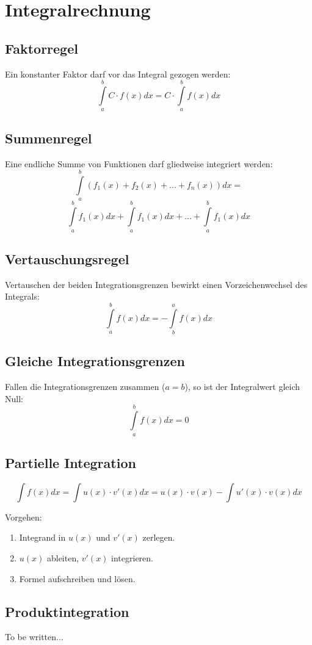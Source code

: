 \documentclass[10pt,a4paper,twocolumn]{article}
\begin{document}
\section{Integralrechnung}

\subsection{Faktorregel}
Ein konstanter Faktor darf vor das Integral gezogen werden:
\[
\int\limits_{a}^{b}C\cdot f(x)dx=C\cdot\int\limits_{a}^{b}f(x)dx
\]

\subsection{Summenregel}
Eine endliche Summe von Funktionen darf gliedweise integriert werden:
\[
\int\limits_{a}^{b}\left(f_1(x)+f_2(x)+...+f_n(x)\right)dx=
\]
\[
\int\limits_{a}^{b}f_1(x)dx+\int\limits_{a}^{b}f_1(x)dx+...+\int\limits_{a}^{b}f_1(x)dx
\]

\subsection{Vertauschungsregel}
Vertauschen der beiden Integrationsgrenzen bewirkt einen Vorzeichenwechsel des Integrals:
\[
\int\limits_{a}^{b}f(x)dx=-\int\limits_{b}^{a}f(x)dx
\]

\subsection{Gleiche Integrationsgrenzen}
Fallen die Integrationsgrenzen zusammen ($a=b$), so ist der Integralwert gleich Null:
\[
\int\limits_{a}^{b}f(x)dx=0
\]

\subsection{Partielle Integration}
\[
\int f(x)dx=\int u(x)\cdot v'(x)dx=u(x)\cdot v(x)-\int u'(x)\cdot v(x)dx
\]

Vorgehen:
\begin{enumerate}
\item Integrand in $u(x)$ und $v'(x)$ zerlegen.
\item $u(x)$ ableiten, $v'(x)$ integrieren.
\item Formel aufschreiben und lösen.
\end{enumerate}

\subsection{Produktintegration}
To be written...
\end{document}
